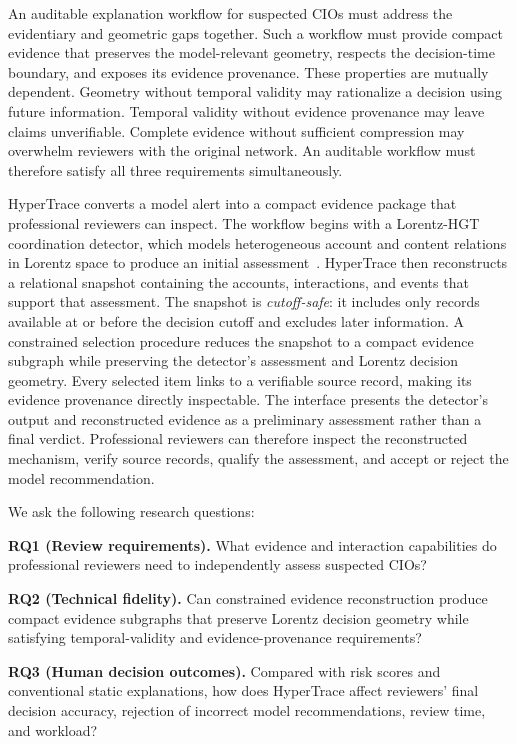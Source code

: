 An auditable explanation workflow for suspected CIOs must address the evidentiary and geometric gaps together. Such a workflow must provide compact evidence that preserves the model-relevant geometry, respects the decision-time boundary, and exposes its evidence provenance. These properties are mutually dependent. Geometry without temporal validity may rationalize a decision using future information. Temporal validity without evidence provenance may leave claims unverifiable. Complete evidence without sufficient compression may overwhelm reviewers with the original network. An auditable workflow must therefore satisfy all three requirements simultaneously.

HyperTrace converts a model alert into a compact evidence package that professional reviewers can inspect. The workflow begins with a Lorentz-HGT coordination detector, which models heterogeneous account and content relations in Lorentz space to produce an initial assessment~\cite{hu2020hgt,yang2024hypformer,park2024hyperbolic,lu2026sahg}. HyperTrace then reconstructs a relational snapshot containing the accounts, interactions, and events that support that assessment. The snapshot is \emph{cutoff-safe}: it includes only records available at or before the decision cutoff and excludes later information. A constrained selection procedure reduces the snapshot to a compact evidence subgraph while preserving the detector's assessment and Lorentz decision geometry. Every selected item links to a verifiable source record, making its evidence provenance directly inspectable. The interface presents the detector's output and reconstructed evidence as a preliminary assessment rather than a final verdict. Professional reviewers can therefore inspect the reconstructed mechanism, verify source records, qualify the assessment, and accept or reject the model recommendation.

We ask the following research questions:

\noindent\textbf{RQ1 (Review requirements).}
What evidence and interaction capabilities do professional reviewers need to independently assess suspected CIOs?

\noindent\textbf{RQ2 (Technical fidelity).}
Can constrained evidence reconstruction produce compact evidence subgraphs that preserve Lorentz decision geometry while satisfying temporal-validity and evidence-provenance requirements?

\noindent\textbf{RQ3 (Human decision outcomes).}
Compared with risk scores and conventional static explanations, how does HyperTrace affect reviewers' final decision accuracy, rejection of incorrect model recommendations, review time, and workload?


